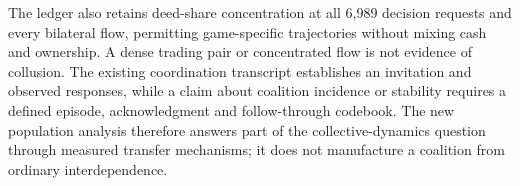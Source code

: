 The ledger also retains deed-share concentration at all 6,989 decision requests
and every bilateral flow, permitting game-specific trajectories without mixing
cash and ownership. A dense trading pair or concentrated flow is not evidence
of collusion. The existing coordination transcript establishes an invitation
and observed responses, while a claim about coalition incidence or stability
requires a defined episode, acknowledgment and follow-through codebook. The
new population analysis therefore answers part of the collective-dynamics
question through measured transfer mechanisms; it does not manufacture a
coalition from ordinary interdependence.

